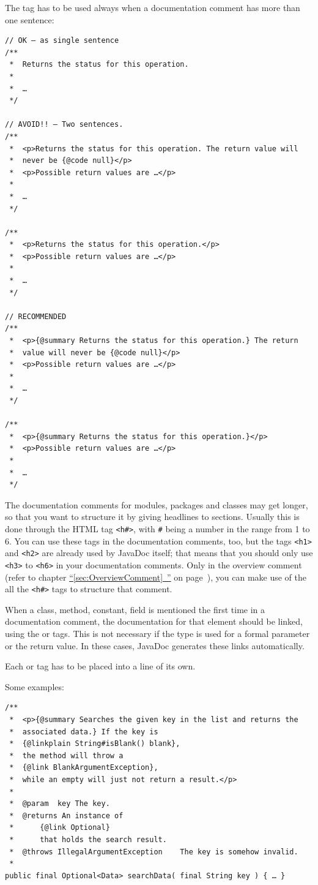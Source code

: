 \documentclass[11pt,a4paper, titlepage, parskip=half, headsepline, footsepline, cleardoublepage=current, headheight=1cm]{scrbook}
\newcommand*{\tqfullvref}[1]{\hyperref[{#1}]{“\ref*{#1}~\nameref*{#1}”} on page~\pageref{#1}}
\begin{document}
The  tag has to be used always when a documentation comment has more than one sentence:

\begin{lstlisting}
// OK – as single sentence
/**
 *  Returns the status for this operation.
 *
 *  …
 */
 
// AVOID!! – Two sentences. 
/**
 *  <p>Returns the status for this operation. The return value will 
 *  never be {@code null}</p>
 *  <p>Possible return values are …</p>
 *
 *  …
 */

/**
 *  <p>Returns the status for this operation.</p>
 *  <p>Possible return values are …</p>
 *
 *  …
 */

// RECOMMENDED
/**
 *  <p>{@summary Returns the status for this operation.} The return 
 *  value will never be {@code null}</p>
 *  <p>Possible return values are …</p>
 *
 *  …
 */

/**
 *  <p>{@summary Returns the status for this operation.}</p>
 *  <p>Possible return values are …</p>
 *
 *  …
 */
\end{lstlisting}

The documentation comments for modules, packages and classes may get longer, so that you want to structure it by giving headlines to sections. Usually this is done through the HTML tag \verb|<h#>|, with \verb|#| being a number in the range from 1 to 6. You can use these tags in the documentation comments, too, but the tags \verb#<h1># and \verb#<h2># are already used by JavaDoc itself; that means that you should only use \verb#<h3># to \verb#<h6># in your documentation comments. Only in the overview comment (refer to chapter \tqfullvref{sec:OverviewComment}), you can make use of the all the \verb|<h#>| tags to structure that comment.

When a class, method, constant, field is mentioned the first time in a documentation comment, the documentation for that element should be linked, using the  or  tags. This is not necessary if the type is used for a formal parameter or the return value. In these cases, JavaDoc generates these links automatically.

Each  or  tag has to be placed into a line of its own.

Some examples:
\begin{lstlisting}
/**
 *  <p>{@summary Searches the given key in the list and returns the
 *  associated data.} If the key is
 *  {@linkplain String#isBlank() blank},
 *  the method will throw a
 *  {@link BlankArgumentException},
 *  while an empty will just not return a result.</p>
 *
 *  @param  key The key.
 *  @returns An instance of
 *      {@link Optional}
 *      that holds the search result.
 *  @throws IllegalArgumentException    The key is somehow invalid.
 *
public final Optional<Data> searchData( final String key ) { … }
\end{lstlisting}
\end{document}

